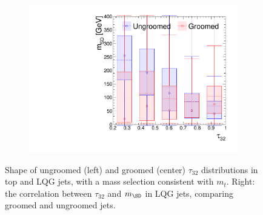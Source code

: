 \begin{figure}[]
\begin{center}
\begin{subfigure}[t]{0.32\textwidth}
            \includegraphics[width=\textwidth]{figures/toptagging/gen/msdtau_QCD.pdf}
            \caption{}
            \label{fig:jets:msdtau}
        \end{subfigure}
        \caption{Shape of ungroomed (left) and groomed (center) $\tau_{32}$ distributions in top and LQG jets, with a mass selection consistent with $m_t$. 
                 Right: the correlation between $\tau_{32}$ and $m_\SD$ in LQG jets, comparing groomed and ungroomed jets. 
                 }
        \label{fig:jets:tau32}
    \end{center}
\end{figure}

\subsubsection{\HTT}

